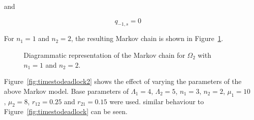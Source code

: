 \documentclass{article}
\begin{document}
and

\begin{equation}
  q_{-1, s} = 0
\end{equation}

For $n_1 = 1$ and $n_2 = 2$, the resulting Markov chain is shown in Figure~\ref{fig:2nodeMC}.

\begin{figure}[!htbp]
    
    \caption{Diagrammatic representation of the Markov chain for $\Omega_2$ with $n_1=1$ and $n_2=2$.}
    \label{fig:2nodeMC}
\end{figure}

Figure~\ref{fig:timestodeadlock2} shows the effect of varying the parameters of the above Markov model.
Base parameters of $\Lambda_1 = 4$, $\Lambda_2 = 5$, $n_1 = 3$, $n_2 = 2$, $\mu_1 = 10$, $\mu_2 = 8$, $r_{12} = 0.25$ and $r_{21} = 0.15$ were used.
similar behaviour to Figure~\ref{fig:timestodeadlock} can be seen.
\end{document}
